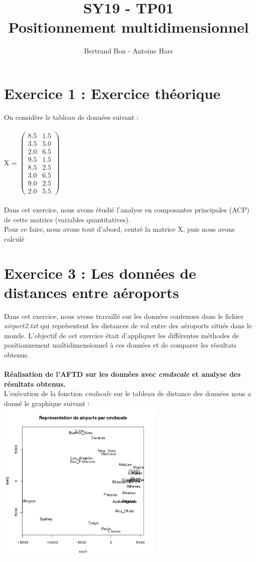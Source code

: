 \documentclass[a4paper, 10pt]{article}
\title{SY19 - TP01\\Positionnement multidimensionnel}
\author{Bertrand Bon - Antoine Hars}
\begin{document}
\maketitle

\section*{Exercice 1 : Exercice théorique}
On considère le tableau de données suivant :\\ \\
X = $\begin{pmatrix} 8.5 & 1.5 \\ 3.5 & 5.0 \\ 2.0 & 6.5 \\ 9.5 & 1.5 \\ 8.5 & 2.5 \\ 3.0 & 6.5 \\ 9.0 & 2.5 \\ 2.0 & 5.5 \end{pmatrix}$\\ \\
Dans cet exercice, nous avons étudié l'analyse en composantes principales (ACP) de cette matrice (variables quantitatives).\\
Pour ce faire, nous avons tout d'abord, centré la matrice X, puis nous avons calculé

\section*{Exercice 3 : Les données de distances entre aéroports}
Dans cet exercice, nous avons travaillé sur les données contenues dans le fichier \textit{airport2.txt} qui représentent les distances de vol
entre des aéroports situés dans le monde. L'objectif de cet exercice était d'appliquer les différentes méthodes
de positionnement multidimensionnel à ces données et de comparer les résultats obtenus.\\ \\
\textbf{Réalisation de l'AFTD sur les données avec \textit{cmdscale} et analyse des résultats obtenus.}\\
L'exécution de la fonction \textit{cmdscale} sur le tableau de distance des données nous a donné le graphique suivant :\\
\includegraphics[height = 8cm, width = 8cm]{plots/plot_airports_cmdscale.png}\\
\end{document}
